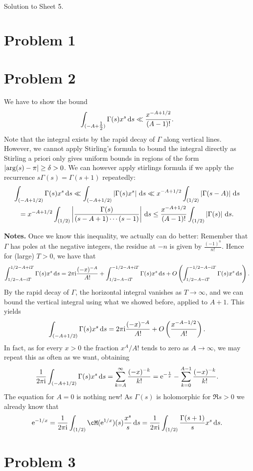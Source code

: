 \documentclass[a4paper,11pt]{article}
\author{Max von Consbruch}
\begin{document}
\begin{center}
    \huge{Solution to Sheet 5.}
\end{center}

\section*{Problem 1}

\section*{Problem 2}
We have to show the bound
\[
    \int_{(-A + \tfrac 12)} \Gamma(s) x^s \mathrm{\,d} s \ll \frac{x^{-A +
    1/2}}{(A-1)!}.
\]
Note that the integral exists by the rapid decay of $\Gamma$ along vertical
lines. However, we cannot apply Stirling's formula to bound the integral directly
as Stirling a priori only gives uniform bounds in regions of the form $\left\lvert \arg(s)
- \pi \right\rvert \geq \delta > 0$. We can however apply stirlings formula if we apply the recurrence
$s\Gamma(s) = \Gamma(s+1)$ repeatedly: 
\begin{multline*}
    \int_{(-A+1/2)} \Gamma(s) x^s \mathrm{\,d} s \ll 
    \int_{(-A+1/2)} \left\lvert \Gamma(s) x^s \right\rvert \mathrm{\,d} s \ll 
    x^{-A+1/2} \int_{(1/2)} \left\lvert \Gamma(s-A) \right\rvert \mathrm{\,d} s \\ 
    = x^{-A+1/2} \int_{(1/2)} \left\lvert \frac {\Gamma(s)}{(s-A+1) \cdots (s-1)} \right\rvert
    \mathrm{\,d} s \leq \frac{x^{-A + 1/2}}{(A-1)!} \int_{(1/2)} \left\lvert \Gamma(s) \right\rvert \mathrm{\,d} s. 
\end{multline*}

\textbf{Notes.}
Once we know this inequality, we actually can do better: Remember that $\Gamma$ has poles at
the negative integers, the residue at $-n$ is given by $\tfrac{(-1)^n}{n!}$. Hence for 
(large) $T > 0$, we have that 
\[
    \int_{1/2-A-\mathrm i T}^{1/2 - A +\mathrm i T} \Gamma(s) x^s \mathrm{\,d} s =
    2 \pi \mathrm i \frac{(-x)^{-A}}{A!} + \int_{1/2-A-\mathrm i T}^{-1/2 - A + \mathrm i T} \Gamma(s) x^s
    \mathrm{\,d} s + O\left( \int_{1/2-A-\mathrm i T}^{-1/2-A - \mathrm i T}  \Gamma(s) x^s \mathrm{\,d} s\right). 
\]
By the rapid decay of $\Gamma$, the horizontal integral vanishes as $T
\rightarrow \infty$, and we can bound the vertical integral using what we
showed before, applied to $A+1$. This yields
\[
    \int_{(-A+1/2)} \Gamma(s) x^s \mathrm{\,d} s = 2 \pi \mathrm i \frac{(-x)^{-A}}{A!} + O\left(\frac{x^{-A-1/2}}{A!}\right).
\]
In fact, as for every $x>0$ the fraction $x^A/A!$ tends to zero as $A \to \infty$, we
may repeat this as often as we want, obtaining
\[
    \frac 1{2 \pi \mathrm i} \int_{(-A+1/2)} \Gamma(s) x^s \mathrm{\,d} s = \sum_{k=A}^\infty \frac{(-x)^{-k}}{k!} 
    = \mathrm e^{-\frac 1x} - \sum_{k=0}^{A-1} \frac{(-x)^{-k}}{k!}.
\]
The equation for $A= 0$ is nothing new! As $\Gamma(s)$ is holomorphic
for $\Re s > 0$ we already know that
\[
    \ec^{-1/x} = \frac{1}{2 \pi \ic} \int_{(1/2)} \cM(\ec^{1/x})(s) \frac{x^s}s \dc s
    = \frac{1}{2 \pi \ic} \int_{(1/2)} \frac{\Gamma(s+1)}{s} x^s \dc s.
\]

\section*{Problem 3}
\end{document}
